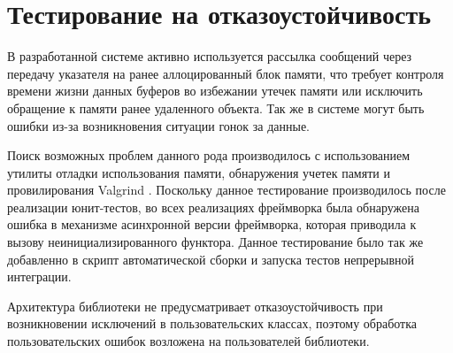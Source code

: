 \section{Тестирование на отказоустойчивость}

В разработанной системе активно используется рассылка сообщений через передачу 
указателя на ранее аллоцированный блок памяти, что требует контроля времени 
жизни данных буферов во избежании утечек памяти или исключить обращение к 
памяти ранее удаленного объекта. Так же в системе могут быть ошибки из-за 
возникновения ситуации гонок за данные.

Поиск возможных проблем данного рода производилось с использованием утилиты отладки использования памяти, обнаружения учетек памяти и провилирования Valgrind \cite{nethercote2007valgrind}. Поскольку данное тестирование производилось после реализации юнит-тестов, во всех реализациях фреймворка была обнаружена ошибка в механизме асинхронной версии фреймворка, которая приводила к вызову неинициализированного функтора. Данное тестирование было так же добавленно в скрипт автоматической сборки и запуска тестов непрерывной интеграции.

Архитектура библиотеки не предусматривает отказоустойчивость при возникновении исключений в пользовательских классах, поэтому обработка пользовательских ошибок возложена на пользователей библиотеки.